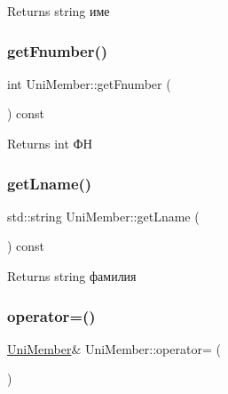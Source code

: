 \begin{DoxyReturn}{Returns}
string име 
\end{DoxyReturn}
\mbox{\label{class_uni_member_ab1de8aa08354456fafb30a946564e6c4}} 
\subsubsection{\texorpdfstring{get\+Fnumber()}{getFnumber()}}
{\footnotesize\ttfamily int Uni\+Member\+::get\+Fnumber (\begin{DoxyParamCaption}{ }\end{DoxyParamCaption}) const}

\begin{DoxyReturn}{Returns}
int ФН 
\end{DoxyReturn}
\mbox{\label{class_uni_member_a312319a40d4a1d1a7c2667121a6f3469}} 
\subsubsection{\texorpdfstring{get\+Lname()}{getLname()}}
{\footnotesize\ttfamily std\+::string Uni\+Member\+::get\+Lname (\begin{DoxyParamCaption}{ }\end{DoxyParamCaption}) const}

\begin{DoxyReturn}{Returns}
string фамилия 
\end{DoxyReturn}
\mbox{\label{class_uni_member_a7f2686113c609f487896e7bc57bd3d94}} 
\subsubsection{\texorpdfstring{operator=()}{operator=()}}
{\footnotesize\ttfamily \hyperlink{class_uni_member}{Uni\+Member}\& Uni\+Member\+::operator= (\begin{DoxyParamCaption}\item[{const \hyperlink{class_uni_member}{Uni\+Member} \&}]{ }\end{DoxyParamCaption})}



